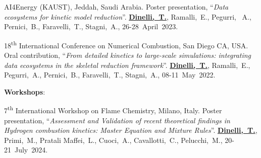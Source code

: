 \begin{etaremune}
   \item
      AI4Energy (KAUST), Jeddah, Saudi Arabia. Poster presentation, ``{\it Data ecosystems for
      kinetic model reduction}''. {\bf \underline{Dinelli,~T.}}, Ramalli,~E., Pegurri,
      ~A., Pernici,~B., Faravelli,~T., Stagni,~A.,
      26-28~April~2023.

   \item
      18\textsuperscript{th} International Conference on Numerical Combustion, San Diego
      CA, USA. Oral contribution, ``{\it From detailed kinetics to large-scale
      simulations: integrating data ecosystems in the skeletal reduction framework}''.
      {\bf \underline{Dinelli,~T.}}, Ramalli,~E., Pegurri,~A., Pernici,~B.,
      Faravelli,~T., Stagni,~A.,
      08-11~May~2022.
\end{etaremune}

\textbf{Workshops}:
\begin{etaremune}
   \item
      7\textsuperscript{th} International Workshop on Flame Chemistry, Milano, Italy.
      Poster presentation, ``{\it Assessment and Validation of recent theoretical
      findings in Hydrogen combustion kinetics: Master Equation and Mixture Rules}''.
      {\bf \underline{Dinelli,~T.}}, Primi,~M., Pratali Maffei,~L., Cuoci,~A.,
      Cavallotti,~C., Pelucchi,~M.,
      20-21~July~2024.
\end{etaremune}
